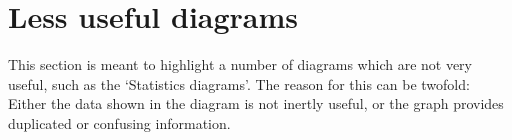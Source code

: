 \section*{Less useful diagrams}\label{sec:UselessDiagrams}

This section is meant to highlight a number of diagrams which are not very useful, such as the `Statistics diagrams'. The reason for this can be twofold: Either the data shown in the diagram is not inertly useful, or the graph provides duplicated or confusing information.